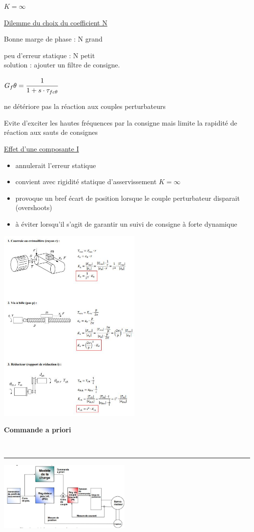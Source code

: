 \documentclass[	DIV=calc,%
							paper=a4,%
							fontsize=10pt,%
							twocolumn]{scrartcl} %
\newcounter{mycounter}
\newcommand{\formdesc}[1]{\large\textbf{#1} \addtocounter{mycounter}{1} \hfill \themycounter \\ \vspace{-3mm} \hrule \vspace{2mm}}
\begin{document}
$K = \infty$

\underline{Dilemme du choix du coefficient N}

Bonne marge de phase : N grand

peu d'erreur statique : N petit \\

solution : ajouter un filtre de consigne.

$G_f\theta = \cfrac{1}{1+s\cdot\tau_{fc\theta}}$

ne détériore pas la réaction aux couples perturbateurs

Evite d'exciter les hautes fréquences par la consigne mais limite la rapidité de réaction aux sauts de consignes

\underline{Effet d’une composante I}

\begin{itemize}
    \item annulerait l’erreur statique
    \item convient avec rigidité statique d'asservissement $ K = \infty $
    \item provoque un bref écart de position lorsque le couple perturbateur disparait (overshoots)
    \item à éviter lorsqu'il s'agit de garantir un suivi de consigne à forte dynamique
\end{itemize}

\includegraphics[width=0.53\textwidth]{img/flemem.JPG}

\formdesc{Commande a priori}

\includegraphics[width=0.49\textwidth]{img/com_apriorie.JPG}
\end{document}
